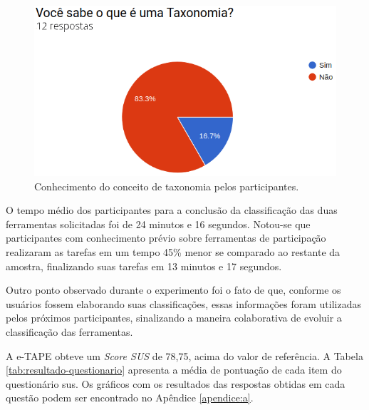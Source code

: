 \begin{figure}[!ht]
    \centering
    \includegraphics[scale=0.4]{./figuras/sabe_taxonomia.png}
    \caption{Conhecimento do conceito de taxonomia pelos participantes.}
    \label{fig:grafico-conhe-taxonomia}
\end{figure}

\par
O tempo médio dos participantes para a conclusão da classificação das duas ferramentas solicitadas foi de 24 minutos e 16 segundos. 
Notou-se que participantes com conhecimento prévio sobre ferramentas de participação realizaram 
as tarefas em um tempo 45\% menor se comparado ao restante da amostra, finalizando suas tarefas em 13 minutos e 17 segundos.

\par 
Outro ponto observado durante o experimento foi o fato de que, conforme os usuários fossem elaborando suas classificações,
essas informações foram utilizadas pelos próximos participantes, sinalizando a maneira colaborativa de evoluir a classificação das ferramentas.

A e-TAPE obteve um \textit{Score SUS} de 78,75, acima do valor de referência. A Tabela \ref{tab:resultado-questionario} apresenta a média de pontuação de cada item do questionário \acrshort{sus}.
Os gráficos com os resultados das respostas obtidas em cada  questão podem ser encontrado no Apêndice \ref{apendice:a}.

